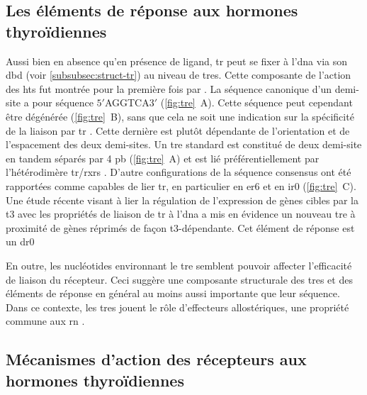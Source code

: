 \documentclass[../main.tex]{subfiles}
\begin{document}
	\subsection{Les éléments de réponse aux hormones thyroïdiennes}
		Aussi bien en absence qu'en présence de ligand, \gls{tr} peut se fixer à l'\gls{dna} via son \gls{dbd} (voir \autoref{subsubsec:struct-tr}) au niveau de \glspl{tre}.
		Cette composante de l'action des \glspl{ht} fut montrée pour la première fois par \citet{Wight1987}.
		La séquence canonique d'un demi-site a pour séquence $5\prime$AGGTCA$3\prime$ (\autoref{fig:tre}~A).
		Cette séquence peut cependant être dégénérée (\autoref{fig:tre}~B), sans que cela ne soit une indication sur la spécificité de la liaison par \gls{tr} \citep{Chatonnet2013}.
		Cette dernière est plutôt dépendante de l'orientation et de l'espacement des deux demi-sites.
		Un \gls{tre} standard est constitué de deux demi-site en tandem séparés par 4 \gls{pb} (\autoref{fig:tre}~A) et est lié préférentiellement par l'hétérodimère \gls{tr}/\glspl{rxr} \citep{Wahlstrom1992}.
		D'autre configurations de la séquence consensus ont été rapportées comme capables de lier \gls{tr}, en particulier en \gls{er6} et en \gls{ir0} (\autoref{fig:tre}~C).
		Une étude récente visant à lier la régulation de l'expression de gènes cibles par la \gls{t3} avec les propriétés de liaison de \gls{tr} à l'\gls{dna} a mis en évidence un nouveau \gls{tre} à proximité de gènes réprimés de façon \gls{t3}-dépendante.
		Cet élément de réponse est un \gls{dr0} \citep{Ramadoss2014}

		

		En outre, les nucléotides environnant le \gls{tre} semblent pouvoir affecter l'efficacité de liaison du récepteur.
		Ceci suggère une composante structurale des \glspl{tre} et des éléments de réponse en général au moins aussi importante que leur séquence.
		Dans ce contexte, les \glspl{tre} jouent le rôle d'effecteurs allostériques, une propriété commune aux \gls{rn} \citep{Hall2002,Billas2013}.


	\subsection{Mécanismes d'action des récepteurs aux hormones thyroïdiennes}
\end{document}
